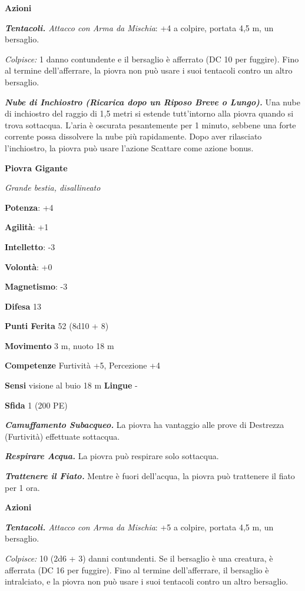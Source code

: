 \begin{multicols}{2}
\textbf{Azioni}

\emph{\textbf{Tentacoli.} Attacco con Arma da Mischia}: +4 a colpire,
portata 4,5 m, un bersaglio.

\emph{Colpisce:} 1 danno contundente e il bersaglio è afferrato (DC 10
per fuggire). Fino al termine dell'afferrare, la piovra non può usare i
suoi tentacoli contro un altro bersaglio.

\emph{\textbf{Nube di Inchiostro (Ricarica dopo un Riposo Breve o
Lungo).}} Una nube di inchiostro del raggio di 1,5 metri si estende
tutt'intorno alla piovra quando si trova sottacqua. L'aria è oscurata
pesantemente per 1 minuto, sebbene una forte corrente possa dissolvere
la nube più rapidamente. Dopo aver rilasciato l'inchiostro, la piovra
può usare l'azione Scattare come azione bonus.

\textbf{Piovra Gigante}

\emph{Grande bestia, disallineato}

\textbf{Potenza}: +4

\textbf{Agilità}: +1

\textbf{Intelletto}: -3

\textbf{Volontà}: +0

\textbf{Magnetismo}: -3

\textbf{Difesa} 13

\textbf{Punti Ferita} 52 (8d10 + 8)

\textbf{Movimento} 3 m, nuoto 18 m

\textbf{Competenze} Furtività +5, Percezione +4

\textbf{Sensi} visione al buio 18 m
\textbf{Lingue} -

\textbf{Sfida} 1 (200 PE)

\emph{\textbf{Camuffamento Subacqueo.}} La piovra ha vantaggio alle
prove di Destrezza (Furtività) effettuate sottacqua.

\emph{\textbf{Respirare Acqua.}} La piovra può respirare solo sottacqua.

\emph{\textbf{Trattenere il Fiato.}} Mentre è fuori dell'acqua, la
piovra può trattenere il fiato per 1 ora.

\textbf{Azioni}

\emph{\textbf{Tentacoli.} Attacco con Arma da Mischia}: +5 a colpire,
portata 4,5 m, un bersaglio.

\emph{Colpisce:} 10 (2d6 + 3) danni contundenti. Se il bersaglio è una
creatura, è afferrata (DC 16 per fuggire). Fino al termine
dell'afferrare, il bersaglio è intralciato, e la piovra non può usare i
suoi tentacoli contro un altro bersaglio.


\end{multicols}

